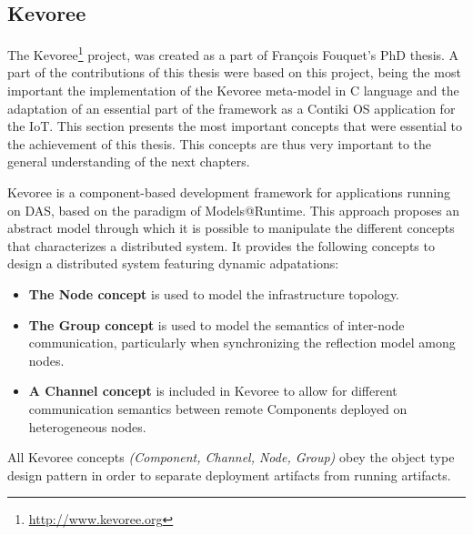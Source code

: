 
\subsection{Kevoree}
\label{subec:kevoree}
The Kevoree\footnote{\url{http://www.kevoree.org}} project, was created as a part of Fran{\c{c}}ois Fouquet's PhD thesis.
A part of the contributions of this thesis were based on this project, being the most important the implementation of the Kevoree meta-model in C language and the adaptation of an essential part of the framework as a Contiki OS\cite{dunkels2004contiki} application for the IoT.
This section presents the most important concepts that were essential to the achievement of this thesis.
This concepts are thus very important to the general understanding of the next chapters.

Kevoree is a component-based development framework for applications running on DAS, based on the paradigm of Models@Runtime.
This approach proposes an abstract model through which it is possible to manipulate the different concepts that characterizes a distributed system.
It provides the following concepts to design a distributed system featuring dynamic adpatations:
\begin{itemize}
	\item \textbf{The Node concept} is used to model the infrastructure topology.
	\item \textbf{The Group concept} is used to model the semantics of inter-node communication, particularly when synchronizing the reflection model among nodes.
	\item \textbf{A Channel concept} is included in Kevoree to allow for different communication semantics between remote Components deployed on heterogeneous nodes. 
\end{itemize}
All Kevoree concepts \textit{(Component, Channel, Node, Group)} obey the object type design pattern\cite{woolf1996type} in order to separate deployment artifacts from running artifacts.

